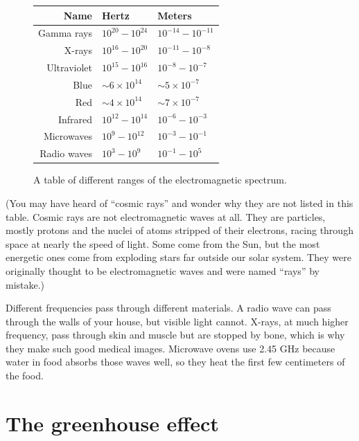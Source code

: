 \begin{figure}[htbp]
    \centering
    \begin{tabular}{r | l | l}
      Name & Hertz & Meters \\
      \hline
    Gamma rays  & $10^{20} - 10^{24}$ & $10^{-14} - 10^{-11}$\\
    X-rays  & $10^{16} - 10^{20}$ & $10^{-11} - 10^{-8}$\\
    Ultraviolet  & $10^{15} - 10^{16}$ & $10^{-8} - 10^{-7}$\\
    Blue & $\sim 6\times10^{14}$ & $\sim 5\times10^{-7}$\\
    Red  & $\sim 4\times10^{14}$ & $\sim 7\times10^{-7}$\\
    Infrared  & $10^{12} - 10^{14}$ & $10^{-6} - 10^{-3}$\\
    Microwaves  & $10^{9} - 10^{12}$ & $10^{-3} - 10^{-1}$\\
    Radio waves  & $10^{3} - 10^{9}$ & $10^{-1} - 10^{5}$\\
    \end{tabular}

    \caption{A table of different ranges of the electromagnetic spectrum.}
    \label{fig:electro}
\end{figure}

(You may have heard of ``cosmic rays'' and wonder why they are
not listed in this table. Cosmic rays are not electromagnetic waves at all. They are particles,
mostly protons and the nuclei of atoms stripped of their electrons, racing
through space at nearly the speed of light. Some come from the Sun, but the
most energetic ones come from exploding stars far outside our solar
system. They were originally thought to be electromagnetic waves and were
named ``rays'' by mistake.)

Different frequencies pass through different materials. A radio wave can
pass through the walls of your house, but visible light cannot. X-rays, at
much higher frequency, pass through skin and muscle but are stopped by
bone, which is why they make such good medical images. Microwave ovens use
2.45 GHz because water in food absorbs those waves well, so they heat the
first few centimeters of the food.

\section{The greenhouse effect}




